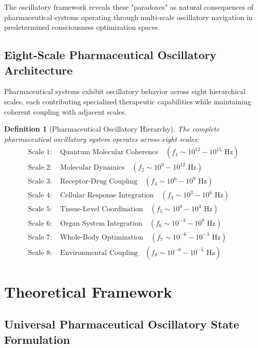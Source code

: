 \documentclass[12pt,a4paper]{article}
\newtheorem{definition}{Definition}
\begin{document}
The oscillatory framework reveals these "paradoxes" as natural consequences of pharmaceutical systems operating through multi-scale oscillatory navigation in predetermined consciousness optimization spaces.

\subsection{Eight-Scale Pharmaceutical Oscillatory Architecture}

Pharmaceutical systems exhibit oscillatory behavior across eight hierarchical scales, each contributing specialized therapeutic capabilities while maintaining coherent coupling with adjacent scales.

\begin{definition}[Pharmaceutical Oscillatory Hierarchy]
The complete pharmaceutical oscillatory system operates across eight scales:
\begin{align}
\text{Scale 1: } &\text{Quantum Molecular Coherence} \quad (f_1 \sim 10^{12}-10^{15} \text{ Hz}) \\
\text{Scale 2: } &\text{Molecular Dynamics} \quad (f_2 \sim 10^9-10^{12} \text{ Hz}) \\
\text{Scale 3: } &\text{Receptor-Drug Coupling} \quad (f_3 \sim 10^6-10^9 \text{ Hz}) \\
\text{Scale 4: } &\text{Cellular Response Integration} \quad (f_4 \sim 10^3-10^6 \text{ Hz}) \\
\text{Scale 5: } &\text{Tissue-Level Coordination} \quad (f_5 \sim 10^0-10^3 \text{ Hz}) \\
\text{Scale 6: } &\text{Organ System Integration} \quad (f_6 \sim 10^{-3}-10^0 \text{ Hz}) \\
\text{Scale 7: } &\text{Whole-Body Optimization} \quad (f_7 \sim 10^{-6}-10^{-3} \text{ Hz}) \\
\text{Scale 8: } &\text{Environmental Coupling} \quad (f_8 \sim 10^{-8}-10^{-5} \text{ Hz})
\end{align}
\end{definition}

\section{Theoretical Framework}

\subsection{Universal Pharmaceutical Oscillatory State Formulation}
\end{document}

